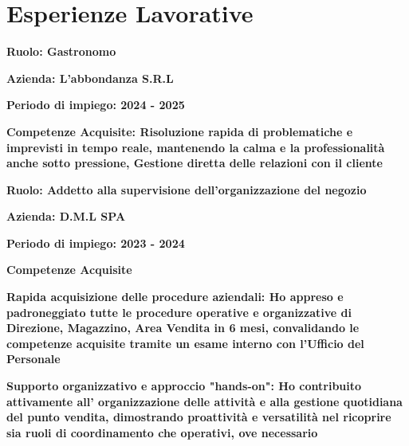 \documentclass{article}
\newenvironment{listaIdentazione}[1]{
			\begin{list}{}{
			  \setlength{\leftmargin}{#1} %
			  \setlength{\itemsep}{0pt}	%
			  \setlength{\parskip}{0pt} %
			  \setlength{\parsep}{0pt} %
			  \setlength{\labelwidth}{0pt} %
			  \setlength{\labelsep}{0pt} %
			  \renewcommand{\makelabel}[1]{} %
			  }
			}{\end{list}}
\newcommand{\spaziocorto}{\\[0.1cm]}
\newcommand{\spaziolungo}{\\[0.3cm]}
\newcommand{\spaziopiulungo}{\\[0.8cm]}
\begin{document}
\section*{\large{Esperienze Lavorative}}
	\begin{flushleft}
	
		\textbf{\normalsize{Ruolo: Gastronomo }}
			\spaziocorto
			\begin{listaIdentazione}{0.5cm}
			\item {\textbf{\normalsize{Azienda: L'abbondanza S.R.L}}}
			\spaziocorto
			\item {\textbf{\normalsize{Periodo di impiego: 2024 - 2025}}}
			\spaziocorto
			\item {\textbf{\normalsize{Competenze Acquisite: Risoluzione rapida
			di problematiche e imprevisti in tempo reale, mantenendo la
			calma e la professionalità anche sotto pressione, Gestione diretta delle
			relazioni con il cliente}}}
			\spaziopiulungo
			\end{listaIdentazione}
			
		\textbf{\normalsize{Ruolo: Addetto alla supervisione dell'organizzazione del
		negozio }}
			\spaziocorto
			\begin{listaIdentazione}{0.5cm}
			\item {\textbf{\normalsize{Azienda: D.M.L SPA}}}
			\spaziocorto
			\item {\textbf{\normalsize{Periodo di impiego: 2023 - 2024}}}
			\spaziocorto
			\item {\textbf{\normalsize{Competenze Acquisite}}}
			\spaziolungo
			\item {\textbf{\normalsize{Rapida acquisizione delle procedure aziendali: Ho
			appreso e padroneggiato tutte le procedure operative e organizzative di
			Direzione, Magazzino, Area Vendita in 6 mesi, convalidando
			le competenze acquisite tramite un esame interno con l'Ufficio del Personale}}}
			\spaziolungo
			\item {\textbf{\normalsize{Supporto organizzativo e approccio "hands-on": Ho
			contribuito attivamente all' organizzazione delle attività e alla gestione
			quotidiana del punto vendita, dimostrando proattività e versatilità nel
			ricoprire sia ruoli di coordinamento che operativi, ove necessario }}}
			\spaziopiulungo
			\end{listaIdentazione}
			

\end{flushleft}
\end{document}
